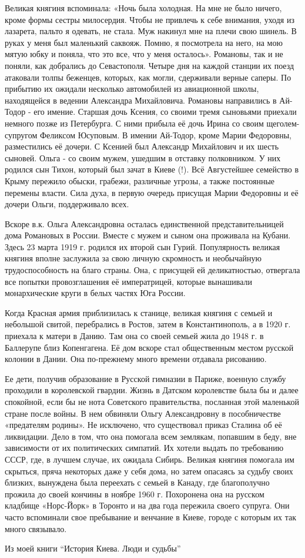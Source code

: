 Великая княгиня вспоминала: «Ночь была
холодная. На мне не было ничего, кроме формы сестры милосердия. Чтобы не
привлечь к себе внимания, уходя из лазарета, пальто я одевать, не стала. Муж
накинул мне на плечи свою шинель. В руках у меня был маленький саквояж. Помню,
я посмотрела на него, на мою мятую юбку и поняла, что это все, что у меня
осталось». Романовы, так и не поняли, как добрались до Севастополя. Четыре дня
на каждой станции их поезд атаковали толпы беженцев, которых, как могли,
сдерживали верные саперы. По прибытию их ожидали несколько автомобилей из
авиационной школы, находящейся в ведении Александра Михайловича. Романовы
направились в Ай-Тодор - его имение. Старшая дочь Ксения, со своими тремя
сыновьями приехали немного позже из Петербурга. С ними прибыла её дочь Ирина со
своим щеголем-супругом Феликсом Юсуповым. В имении Ай-Тодор, кроме Марии
Федоровны, разместились её дочери. С Ксенией был Александр Михайлович и их
шесть сыновей. Ольга - со своим мужем, ушедшим в отставку полковником. У них
родился сын Тихон, который был зачат в Киеве (!). Всё Августейшее семейство в
Крыму пережило обыски, грабежи, различные угрозы, а также постоянные перемены
власти. Сила духа, в первую очередь присущая Марии Федоровны и её дочери Ольги,
поддерживало всех.

Вскоре в.к. Ольга Александровна осталась единственной представительницей дома
Романовых в России. Вместе с мужем и сыном она проживала на Кубани. Здесь 23
марта 1919 г. родился их второй сын Гурий. Популярность великая княгиня вполне
заслужила за свою личную скромность и необычайную трудоспособность на благо
страны. Она, с присущей ей деликатностью, отвергала все попытки провозглашения
её императрицей, которые вынашивали монархические круги в белых частях Юга
России.

Когда Красная армия приблизилась к станице, великая княгиня с семьей и
небольшой свитой, перебрались в Ростов, затем в Константинополь, а в 1920 г.
приехала к матери в Данию. Там она со своей семьей жила до 1948 г. в Баллерупе
близ Копенгагена. Её дом вскоре стал общественным местом русской колонии в
Дании. Она по-прежнему много времени отдавала рисованию. 

Ее дети, получив образование в Русской гимназии в Париже, военную службу
проходили в королевской гвардии. Жизнь в Датском королевстве была бы и далее
спокойной, если бы не нота Советского правительства, посланная этой маленькой
стране после войны. В нем обвиняли Ольгу Александровну в пособничестве
«предателям родины». Не исключено, что существовал приказ Сталина об её
ликвидации. Дело в том, что она помогала всем землякам, попавшим в беду, вне
зависимости от их политических симпатий. Их хотели выдать по требованию СССР,
где, в лучшем случае, их ожидала Сибирь.  Великая княгиня помогала им скрыться,
пряча некоторых даже у себя дома, но затем опасаясь за судьбу своих близких,
вынуждена была переехать с семьей в Канаду, где благополучно прожила до своей
кончины в ноябре 1960 г. Похоронена она на русском кладбище «Норс-Йорк» в
Торонто и на два года пережила своего супруга. Они часто вспоминали свое
пребывание и венчание в Киеве, городе с которым их так много связывало.

Из моей книги \enquote{История Киева. Люди и судьбы}

